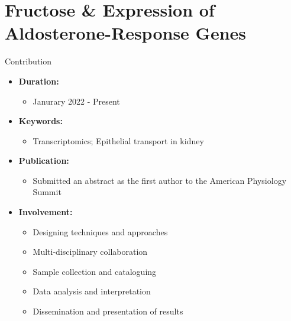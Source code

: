 \documentclass[
11pt,notheorems,hyperref={pdfauthor=whatever}
]{beamer}
\begin{document}
\section{Fructose \& Expression of Aldosterone-Response Genes}
\begin{frame}{}{Contribution}
\begin{itemize}
    \item \textbf{Duration:} 
    \begin{itemize}
        \item Janurary 2022 - Present
    \end{itemize}
    \item \textbf{Keywords:} 
    \begin{itemize}
        \item Transcriptomics; Epithelial transport in kidney
    \end{itemize}
    \item \textbf{Publication:} 
    \begin{itemize}
        \item Submitted an abstract as the first author to the American Physiology Summit
    \end{itemize}
    \item \textbf{Involvement:}
    \begin{itemize}
        \item Designing techniques and approaches
        \item Multi-disciplinary collaboration
        \item Sample collection and cataloguing
        \item Data analysis and interpretation
        \item Dissemination and presentation of results
    \end{itemize}
\end{itemize}
\end{frame}
\end{document}
